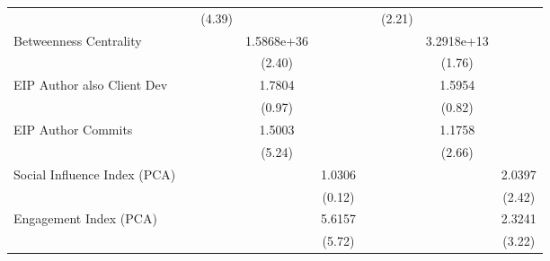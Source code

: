 {\begin{tabular}{l*{8}{c}}
                                   &                     &      (4.39)         &                     &                     &                     &      (2.21)         &                     &                     \\
[1em]
Betweenness Centrality             &                     &                     &  1.5868e+36\sym{**} &                     &                     &                     &  3.2918e+13\sym{*}  &                     \\
                                   &                     &                     &      (2.40)         &                     &                     &                     &      (1.76)         &                     \\
[1em]
EIP Author also Client Dev         &                     &                     &      1.7804         &                     &                     &                     &      1.5954         &                     \\
                                   &                     &                     &      (0.97)         &                     &                     &                     &      (0.82)         &                     \\
[1em]
EIP Author Commits                 &                     &                     &      1.5003\sym{***}&                     &                     &                     &      1.1758\sym{***}&                     \\
                                   &                     &                     &      (5.24)         &                     &                     &                     &      (2.66)         &                     \\
[1em]
Social Influence Index (PCA)       &                     &                     &                     &      1.0306         &                     &                     &                     &      2.0397\sym{**} \\
                                   &                     &                     &                     &      (0.12)         &                     &                     &                     &      (2.42)         \\
[1em]
Engagement Index (PCA)             &                     &                     &                     &      5.6157\sym{***}&                     &                     &                     &      2.3241\sym{***}\\
                                   &                     &                     &                     &      (5.72)         &                     &                     &                     &      (3.22)         \\

\end{tabular}}
